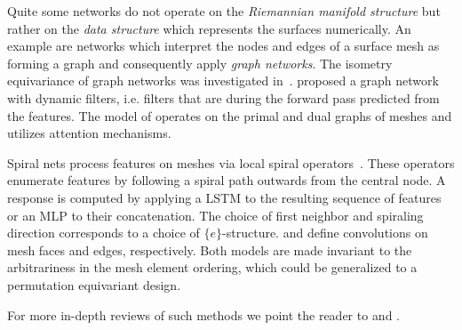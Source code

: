 Quite some networks do not operate on the \emph{Riemannian manifold structure} but rather on the \emph{data structure} which represents the surfaces numerically.
An example are networks which interpret the nodes and edges of a surface mesh as forming a graph and consequently apply \emph{graph networks}.
The isometry equivariance of graph networks was investigated in~\cite{khasanova2018isometric,horie2020isometric}.
\citet{verma2018feastnet} proposed a graph network with dynamic filters, i.e. filters that are during the forward pass predicted from the features.
The model of \citet{milano2020primaldual} operates on the primal and dual graphs of meshes and utilizes attention mechanisms.

Spiral nets process features on meshes via local spiral operators~\cite{lim2018simple,gong2019spiralnet++}.
These operators enumerate features by following a spiral path outwards from the central node.
A response is computed by applying a LSTM to the resulting sequence of features or an MLP to their concatenation.
The choice of first neighbor and spiraling direction corresponds to a choice of $\{e\}$-structure.
\citet{hanocka2019meshcnn} and \citet{hertz2020GeomTextureSynthesis} define convolutions on mesh faces and edges, respectively.
Both models are made invariant to the arbitrariness in the mesh element ordering, which could be generalized to a permutation equivariant design.

For more in-depth reviews of such methods we point the reader to \citet{bronstein2017geometric} and \citet{guo2020deep}.
